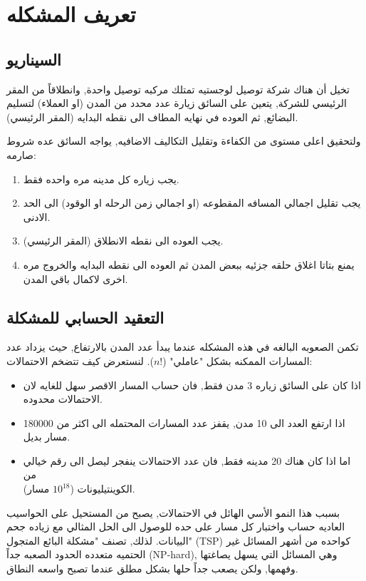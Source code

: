 \documentclass{article}
\newcommand{\en}[1]{\textenglish{#1}}
\begin{document}
\newpage
\tableofcontents
\newpage

\section{تعريف المشكله}
\subsection{السيناريو}
تخيل أن هناك شركة توصيل لوجستيه تمتلك مركبه توصيل واحدة, وانطلاقاً من المقر الرئيسي للشركة,
يتعين على السائق زيارة عدد محدد من المدن (او العملاء) لتسليم البضائع, ثم العوده في نهايه المطاف
الى نقطه البدايه (المقر الرئيسي).

ولتحقيق اعلى مستوى من الكفاءة وتقليل التكاليف الاضافيه, يواجه السائق عده شروط صارمه:
\begin{enumerate}
	\item   يجب زياره كل مدينه مره واحده فقط.
	\item يجب تقليل اجمالي المسافه المقطوعه (او اجمالي زمن الرحله او الوقود) الى الحد الادنى.
	\item يجب العوده الى نقطه الانطلاق (المقر الرئيسي).
	\item يمنع بتاتا اغلاق حلقه جزئيه ببعض المدن ثم العوده الى نقطه البدايه والخروج مره اخرى لاكمال باقي المدن.
\end{enumerate}

\subsection{التعقيد الحسابي للمشكلة}
تكمن الصعوبه البالغه في هذه المشكله عندما يبدأ عدد المدن بالارتفاع, حيث يزداد عدد المسارات الممكنه
بشكل "عاملي" ($n!$). لنستعرض كيف تتضخم الاحتمالات:

\begin{itemize}
	\item اذا كان على السائق زياره 3 مدن فقط, فان حساب المسار الاقصر سهل للغايه لان الاحتمالات محدوده. 
	\item اذا ارتفع العدد الى 10 مدن, يقفز عدد المسارات المحتمله الى اكثر من 180000 مسار بديل. 
	\item  اما اذا كان هناك 20 مدينه فقط, فان عدد الاحتمالات ينفجر ليصل الى رقم خيالي من\\ الكوينتيليونات ($10^{18}$ مسار). 
\end{itemize}

بسبب هذا النمو الأسي الهائل في الاحتمالات, يصبح من المستحيل على الحواسيب العاديه حساب واختبار كل مسار على حده للوصول الى الحل المثالي مع زياده جحم البيانات. لذلك, تصنف "مشكلة البائع المتجول"  (\en{TSP})  كواحده من أشهر المسائل غير الحتميه متعدده الحدود الصعبه جداً (\en{NP-hard}), وهي المسائل التي يسهل يصاغتها وفهمها, ولكن يصعب جداً حلها بشكل مطلق عندما تصبح واسعه النطاق.
\end{document}
